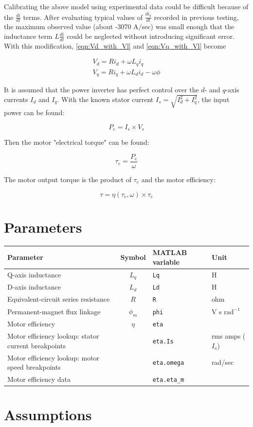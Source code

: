 \documentclass[../SimBALink.tex]{subfiles}
\begin{document}
		Calibrating the above model using experimental data could be difficult because of the $\frac{d i}{d t}$ terms. After evaluating typical values of $\frac{d i_q}{d t}$ recorded in previous testing, the maximum observed value (about -3070 A/sec) was small enough that the inductance term $L \frac{d i}{d t}$ could be neglected without introducing significant error. With this modification, \ref{eqn:Vd_with_Vl} and \ref{eqn:Vq_with_Vl} become
		
		\begin{gather}
			V_d		= R i_d + \omega L_q i_q				\label{eqn:Vd_without_Vl}\\
			V_q		= R i_q + \omega L_d i_d - \omega \phi		\label{eqn:Vq_without_Vl}
		\end{gather}
		
		It is assumed that the power inverter has perfect control over the $d$- and $q$-axis currents $I_d$ and $I_q$. With the known stator current $I_s = \sqrt{I_d^2 + I_q^2}$, the input power can be found:
		
		\begin{equation}
			P_e = I_s \times V_s
		\end{equation}
		
		Then the motor "electrical torque" can be found:
		
		\begin{equation}
			\tau_e = \frac{P_e}{\omega}
		\end{equation}
		
		The motor output torque is the product of $\tau_e$ and the motor efficiency:
		
		\begin{equation}
			\tau	=	\eta(\tau_e, \omega) \times \tau_e
		\end{equation}

\section{Parameters}
	
	\renewcommand{\arraystretch}{1.5}
	\begin{tabular}{ p{5cm} | c | l | l }
		Parameter					&	Symbol				&	MATLAB variable	&	Unit						\\\hline	
		Q-axis inductance				&	$L_q$				&	\texttt{Lq}			&	H			\\
		D-axis inductance				&	$L_d$				&	\texttt{Ld}			&	H			\\
		Equivalent-circuit series resistance	&	$R$					&	\texttt{R}			&	ohm			\\
		Permanent-magnet flux linkage	&	$\phi_m$				&	\texttt{phi}		&	V s $\text{rad}^{-1}$	\\
		Motor efficiency				&	$\eta$				&	\texttt{eta}		&				\\
		Motor efficiency lookup: stator current breakpoints	&			&	\texttt{eta.Is}		&	rms amps ($I_s$)	\\
		Motor efficiency lookup: motor speed breakpoints	&			&	\texttt{eta.omega}	& 	rad/sec		\\
		Motor efficiency data			&						&	\texttt{eta.eta\_m}	&	
	\end{tabular}


\section{Assumptions}



\end{document}

